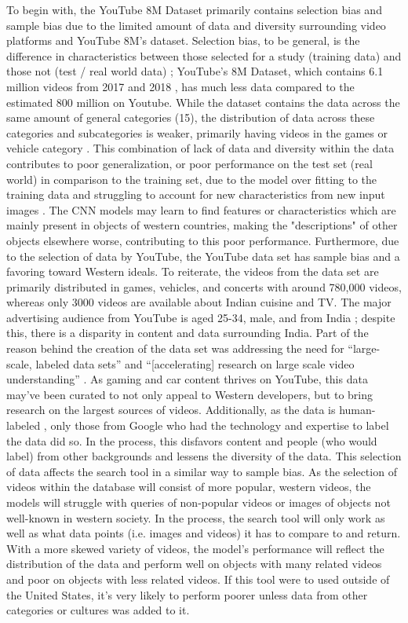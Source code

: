\documentclass[10pt,twocolumn]{article}
\begin{document}
To begin with, the YouTube 8M Dataset primarily contains selection bias and sample bias due to the limited amount of data and diversity surrounding video platforms and YouTube 8M’s dataset. Selection bias, to be general, is the difference in characteristics between those selected for a study (training data) and those not (test / real world data) \cite{Yu2020}; YouTube’s 8M Dataset, which contains 6.1 million videos from 2017 and 2018 \cite{googleYT8M}, has much less data compared to the estimated 800 million on Youtube. While the dataset contains the data across the same amount of general categories (15), the distribution of data across these categories and subcategories is weaker, primarily having videos in the games or vehicle category \cite{googleYT8M}. This combination of lack of data and diversity within the data contributes to poor generalization, or poor performance on the test set (real world) in comparison to the training set, due to the model over fitting to the training data and struggling to account for new characteristics from new input images \cite{Yu2020}. The CNN models may learn to find features or characteristics which are mainly present in objects of western countries, making the "descriptions" of other objects elsewhere worse, contributing to this poor performance. Furthermore, due to the selection of data by YouTube, the YouTube data set has sample bias and a favoring toward Western ideals. To reiterate, the videos from the data set are primarily distributed in games, vehicles, and concerts with around 780,000 videos, whereas only 3000 videos are available about Indian cuisine and TV. The major advertising audience from YouTube is aged 25-34, male, and from India \cite{HootSuite2022}; despite this, there is a disparity in content and data surrounding India. Part of the reason behind the creation of the data set was addressing the need for “large-scale, labeled data sets” and “[accelerating] research on large scale video understanding” \cite{Warrick2020}. As gaming and car content thrives on YouTube, this data may’ve been curated to not only appeal to Western developers, but to bring research on the largest sources of videos. Additionally, as the data is human-labeled \cite{googleYT8M}, only those from Google who had the technology and expertise to label the data did so. In the process, this disfavors content and people (who would label) from other backgrounds and lessens the diversity of the data. This selection of data affects the search tool in a similar way to sample bias. As the selection of videos within the database will consist of more popular, western videos, the models will struggle with queries of non-popular videos or images of objects not well-known in western society. In the process, the search tool will only work as well as what data points (i.e. images and videos) it has to compare to and return. With a more skewed variety of videos, the model's performance will reflect the distribution of the data and perform well on objects with many related videos and poor on objects with less related videos. If this tool were to used outside of the United States, it's very likely to perform poorer unless data from other categories or cultures was added to it.  
\end{document}

